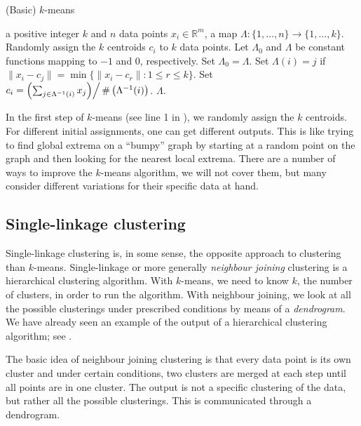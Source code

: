 \documentclass[a4paper, 12pt]{article}
\numberwithin{equation}{section}
\numberwithin{figure}{section}
\theoremstyle{definition}
\renewcommand{\leq}{\leqslant}
\newcommand{\R}{\mathbb{R}}
\begin{document}
\begin{algorithm}
	\caption{(Basic) $k$-means}\label{alg:k-means}
	\begin{algorithmic}[1]
		\Require a positive integer $k$ and $n$ data points $x_i\in\R^m$,
		\Ensure a map $\Lambda : \{1,\dots,n\} \to \{1,\dots, k\}$.
		\State Randomly assign the $k$ centroids $c_i$ to $k$ data points.
		\State Let $\Lambda_0$ and $\Lambda$ be constant functions mapping to $-1$ and $0$, respectively.
		\While{$\Lambda_0 \neq \Lambda$}
			\State Set $\Lambda_0 = \Lambda$.
				\State Set $\Lambda(i) = j$ if $\|x_i-c_j\| = \min\{\|x_i-c_r\| : 1\leq r \leq k\}$.
			\EndFor
				\State Set $c_i = \left(\sum_{j \in \Lambda^{-1}(i)} x_j\middle) \right/ \# \left(\Lambda^{-1}(i)\right)$.
			\EndFor
		\EndWhile
		\State \Return $\Lambda$.
	\end{algorithmic}
\end{algorithm}

In the first step of $k$-means (see line 1 in ), we randomly
assign the $k$ centroids. For different initial assignments, one can get
different outputs. This is like trying to find global extrema on a ``bumpy''
graph by starting at a random point on the graph and then looking for the
nearest local extrema. There are a number of ways to improve the $k$-means
algorithm, we will not cover them, but many consider different variations for
their specific data at hand. 

\subsection{Single-linkage clustering}

Single-linkage clustering is, in some sense, the opposite approach to clustering
than $k$-means. Single-linkage or more generally \emph{neighbour joining}
clustering is a hierarchical clustering algorithm. With $k$-means, we need to
know $k$, the number of clusters, in order to run the algorithm. With neighbour
joining, we look at all the possible clusterings under prescribed conditions by
means of a \emph{dendrogram}. We have already seen an example of the output of a
hierarchical clustering algorithm; see .

The basic idea of neighbour joining clustering is that every data point is its
own cluster and under certain conditions, two clusters are merged at each step
until all points are in one cluster. The output is not a specific clustering of
the data, but rather all the possible clusterings. This is communicated through
a dendrogram. 
\end{document}
